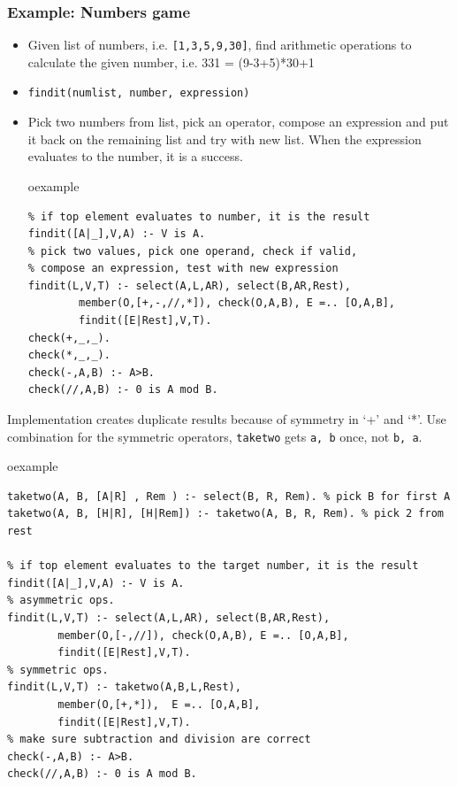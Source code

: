 \begin{frame}[fragile]
\frametitle{Example: Numbers game}
\small
\begin{itemize}
\item Given list of numbers, i.e. \texttt{[1,3,5,9,30]}, find arithmetic operations to calculate the given number, i.e. 331 = (9-3+5)*30+1
\item \lstinline!findit(numlist, number, expression)!
\item Pick two numbers from list, pick an operator, compose an expression and put it
back on  the remaining list and try with new list. When the expression evaluates to the number, it is a success.\\
\begin{beamercolorbox}{oexample}
\begin{lstlisting}
% if top element evaluates to number, it is the result
findit([A|_],V,A) :- V is A. 
% pick two values, pick one operand, check if valid,
% compose an expression, test with new expression
findit(L,V,T) :- select(A,L,AR), select(B,AR,Rest),
        member(O,[+,-,//,*]), check(O,A,B), E =.. [O,A,B],
        findit([E|Rest],V,T).
check(+,_,_).
check(*,_,_).
check(-,A,B) :- A>B.
check(//,A,B) :- 0 is A mod B.
\end{lstlisting}
\end{beamercolorbox}
\end{itemize}
\end{frame}

\begin{frame}[fragile]
\small
Implementation creates duplicate results because of symmetry in `+' and `*'.
Use combination for the symmetric operators, \lstinline!taketwo! gets
 \lstinline!a, b!  once, not \lstinline!b, a!.
\begin{beamercolorbox}{oexample}
\begin{lstlisting}
taketwo(A, B, [A|R] , Rem ) :- select(B, R, Rem). % pick B for first A
taketwo(A, B, [H|R], [H|Rem]) :- taketwo(A, B, R, Rem). % pick 2 from rest

% if top element evaluates to the target number, it is the result
findit([A|_],V,A) :- V is A. 
% asymmetric ops.
findit(L,V,T) :- select(A,L,AR), select(B,AR,Rest),
        member(O,[-,//]), check(O,A,B), E =.. [O,A,B],
        findit([E|Rest],V,T).
% symmetric ops.
findit(L,V,T) :- taketwo(A,B,L,Rest),
        member(O,[+,*]),  E =.. [O,A,B],
        findit([E|Rest],V,T).
% make sure subtraction and division are correct
check(-,A,B) :- A>B.
check(//,A,B) :- 0 is A mod B.
\end{lstlisting}
\end{beamercolorbox}
\end{frame}

